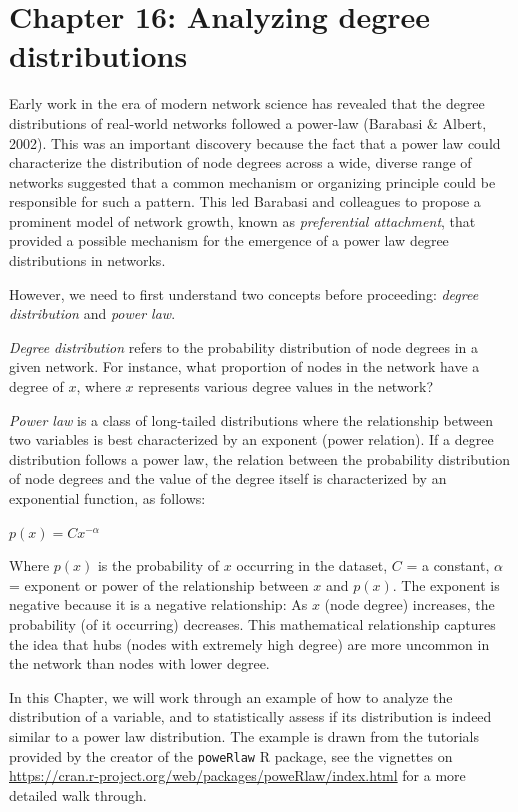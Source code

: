 \documentclass[
]{book}
\begin{document}
\chapter{Chapter 16: Analyzing degree distributions}\label{ch16}

Early work in the era of modern network science has revealed that the degree distributions of real-world networks followed a power-law (Barabasi \& Albert, 2002). This was an important discovery because the fact that a power law could characterize the distribution of node degrees across a wide, diverse range of networks suggested that a common mechanism or organizing principle could be responsible for such a pattern. This led Barabasi and colleagues to propose a prominent model of network growth, known as \emph{preferential attachment}, that provided a possible mechanism for the emergence of a power law degree distributions in networks.

However, we need to first understand two concepts before proceeding: \emph{degree distribution} and \emph{power law}.

\emph{Degree distribution} refers to the probability distribution of node degrees in a given network. For instance, what proportion of nodes in the network have a degree of \(x\), where \(x\) represents various degree values in the network?

\emph{Power law} is a class of long-tailed distributions where the relationship between two variables is best characterized by an exponent (power relation). If a degree distribution follows a power law, the relation between the probability distribution of node degrees and the value of the degree itself is characterized by an exponential function, as follows:

\(p(x) = Cx^{-\alpha}\)

Where \(p(x)\) is the probability of \(x\) occurring in the dataset, \(C\) = a constant, \(\alpha\) = exponent or power of the relationship between \(x\) and \(p(x)\). The exponent is negative because it is a negative relationship: As \(x\) (node degree) increases, the probability (of it occurring) decreases. This mathematical relationship captures the idea that hubs (nodes with extremely high degree) are more uncommon in the network than nodes with lower degree.

In this Chapter, we will work through an example of how to analyze the distribution of a variable, and to statistically assess if its distribution is indeed similar to a power law distribution. The example is drawn from the tutorials provided by the creator of the \texttt{poweRlaw} R package, see the vignettes on \url{https://cran.r-project.org/web/packages/poweRlaw/index.html} for a more detailed walk through.
\end{document}
